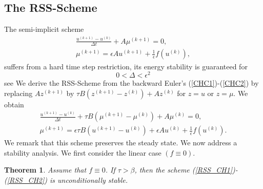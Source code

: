 \documentclass[11pt]{article}
\newtheorem{theorem}{Theorem}[section]
\newcommand{\Frac}[2] {\frac{\textstyle #1} {\textstyle #2}}
\begin{document}
\subsection{The RSS-Scheme}
The semi-implicit scheme
\begin{eqnarray}\label{CHC1}
\Frac{u^{(k+1)}-u^{(k)}}{\Delta t} +A\mu^{(k+1)}=0,\\
\label{CHC2}
\mu^{(k+1)}=\epsilon Au^{(k+1)}+\Frac{1}{\epsilon}f(u^{(k)}),
\end{eqnarray}
suffers from a hard time step restriction, its energy stability is guaranteed for
$$
0<\Delta<\epsilon^2
$$
see \cite{JShenACCH}
We derive the RSS-Scheme from the backward Euler's (\ref{CHC1})-(\ref{CHC2})  by
replacing $Az^{(k+1)}$ by $\tau B(z^{(k+1)}-z^{(k)})+Az^{(k)}$ for $z=u$ or $z=\mu$. We obtain
\begin{eqnarray}
\label{RSS_CH1}
\Frac{u^{(k+1)}-u^{(k)}}{\Delta t}+\tau B(\mu^{(k+1)}-\mu^{(k)}) +A\mu^{(k)}=0,\\
\label{RSS_CH2}
\mu^{(k+1)}=\epsilon \tau B (u^{(k+1)}-u^{(k)})+\epsilon Au^{(k)}+\Frac{1}{\epsilon} f(u^{(k)}).
\end{eqnarray}
We remark that this scheme preserves the steady state. We now address a stability analysis.
We first consider the linear case $(f \equiv 0)$.
\begin{theorem}
Assume that $f \equiv 0$.
If $\tau > \beta $, then the scheme (\ref{RSS_CH1})-(\ref{RSS_CH2}) 
is unconditionally stable.
\end{theorem}
\end{document}
